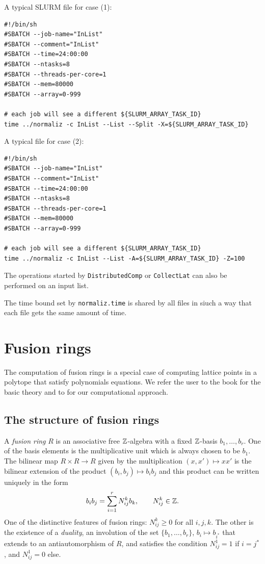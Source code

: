 A typical SLURM file for case (1):
\begin{Verbatim}
#!/bin/sh
#SBATCH --job-name="InList"
#SBATCH --comment="InList"
#SBATCH --time=24:00:00
#SBATCH --ntasks=8
#SBATCH --threads-per-core=1
#SBATCH --mem=80000
#SBATCH --array=0-999

# each job will see a different ${SLURM_ARRAY_TASK_ID}
time ../normaliz -c InList --List --Split -X=${SLURM_ARRAY_TASK_ID}
\end{Verbatim}

A typical file for case (2):
\begin{Verbatim}
#!/bin/sh
#SBATCH --job-name="InList"
#SBATCH --comment="InList"
#SBATCH --time=24:00:00
#SBATCH --ntasks=8
#SBATCH --threads-per-core=1
#SBATCH --mem=80000
#SBATCH --array=0-999

# each job will see a different ${SLURM_ARRAY_TASK_ID}
time ../normaliz -c InList --List -A=${SLURM_ARRAY_TASK_ID} -Z=100
\end{Verbatim}
	
The operations started by \verb*|DistributedComp| or \verb*|CollectLat| can also be performed on an input list.

The time bound set by \verb*|normaliz.time| is shared by all files in siuch a way that each file gets the same amount of time.

\newpage

\section{Fusion rings}\label{fusion_rings}

The computation of fusion rings is a special case of computing lattice points in a polytope that satisfy polynomials equations. We refer the user to the book \cite{EGNO} for the basic theory and to \cite{ABPP} for our computational approach.

\subsection{The structure of fusion rings}\label{fusion_structure}

A \emph{fusion ring} $R$ is an associative free ${\mathbb Z}$-algebra with a fixed ${\mathbb Z}$-basis $b_1,\dots,b_r$. One of the basis elements is the multiplicative unit which is always chosen to be $b_1$. The bilinear map $R\times R\to R$ given by the multiplication $(x,x')\mapsto xx'$ is the bilinear extension of the product $(b_i, b_j)\mapsto b_ib_j$ and this product can be written uniquely in the form
$$
b_i b_j = \sum_{i=1}^r N_{ij}^k b_k, \qquad N_{ij}^k\in {\mathbb Z}.
$$
One of the  distinctive features of fusion rings: $N_{ij}^k\ge 0$ for all $i,j,k$. The other is the existence of a \emph{duality}, an involution of the set $\{b_1,\dots,b_r\}$, $b_i\mapsto b_{i^*}$ that extends to an antiautomorphism of $R$, and satisfies the condition $N_{ij}^1 = 1$ if $i=j^*$, and $N_{ij}^1 = 0$ else.

